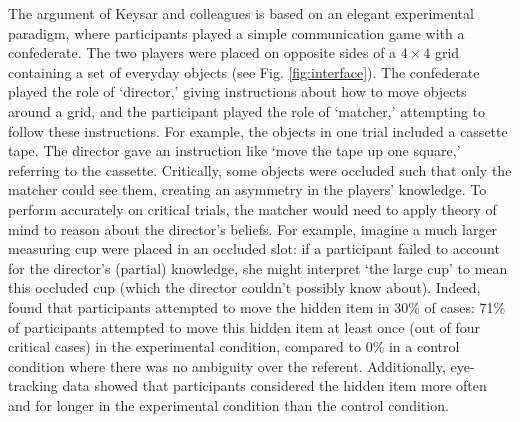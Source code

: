 \documentclass[10pt,letterpaper]{article}
\begin{document}
The argument of Keysar and colleagues is based on an elegant experimental paradigm, where participants played a simple communication game with a confederate. The two players were placed on opposite sides of a $4 \times 4$ grid containing a set of everyday objects (see Fig. \ref{fig:interface}). The confederate played the role of `director,' giving instructions about how to move objects around a grid, and the participant played the role of `matcher,' attempting to follow these instructions. For example, the objects in one trial included a cassette tape. The director gave an instruction like `move the tape up one square,' referring to the cassette.
Critically, some objects were occluded such that only the matcher could see them, creating an asymmetry in the players' knowledge. To perform accurately on critical trials, the matcher would need to apply theory of mind to reason about the director's beliefs. For example, imagine a much larger measuring cup were placed in an occluded slot: if a participant failed to account for the director's (partial) knowledge, she might interpret `the large cup' to mean this occluded cup (which the director couldn't possibly know about). 
Indeed,  found that participants attempted to move the hidden item in 30\% of cases: 71\% of participants attempted to move this hidden item at least once (out of four critical cases) in the experimental condition, compared to 0\% in a control condition where there was no ambiguity over the referent. 
Additionally, eye-tracking data showed that participants considered the hidden item more often and for longer in the experimental condition than the control condition. 
\end{document}

